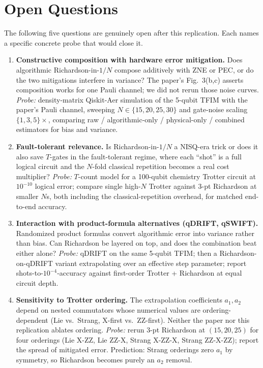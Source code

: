 \section*{Open Questions}

The following five questions are genuinely open after this replication.
Each names a specific concrete probe that would close it.

\begin{enumerate}
  \item \textbf{Constructive composition with hardware error mitigation.}
        Does algorithmic Richardson-in-$1/N$ compose additively with ZNE
        or PEC, or do the two mitigations interfere in variance?
        The paper's Fig.~3(b,c) asserts composition works for one Pauli
        channel; we did not rerun those noise curves.
        \emph{Probe:} density-matrix Qiskit-Aer simulation of the 5-qubit
        TFIM with the paper's Pauli channel, sweeping
        $N\in\{15,20,25,30\}$ and gate-noise scaling $\{1,3,5\}\times$,
        comparing raw / algorithmic-only / physical-only / combined
        estimators for bias and variance.

  \item \textbf{Fault-tolerant relevance.}
        Is Richardson-in-$1/N$ a NISQ-era trick or does it also save
        $T$-gates in the fault-tolerant regime, where each ``shot'' is
        a full logical circuit and the $N$-fold classical repetition
        becomes a real cost multiplier?
        \emph{Probe:} $T$-count model for a 100-qubit chemistry Trotter
        circuit at $10^{-10}$ logical error; compare single high-$N$
        Trotter against 3-pt Richardson at smaller $N$s, both including
        the classical-repetition overhead, for matched end-to-end
        accuracy.

  \item \textbf{Interaction with product-formula alternatives (qDRIFT,
        qSWIFT).}
        Randomized product formulas convert algorithmic error into
        variance rather than bias. Can Richardson be layered on top,
        and does the combination beat either alone?
        \emph{Probe:} qDRIFT on the same 5-qubit TFIM; then a
        Richardson-on-qDRIFT variant extrapolating over an effective
        step parameter; report shots-to-$10^{-4}$-accuracy against
        first-order Trotter + Richardson at equal circuit depth.

  \item \textbf{Sensitivity to Trotter ordering.}
        The extrapolation coefficients $a_1,a_2$ depend on nested
        commutators whose numerical values are ordering-dependent
        (Lie vs.\ Strang, X-first vs.\ ZZ-first). Neither the paper
        nor this replication ablates ordering.
        \emph{Probe:} rerun 3-pt Richardson at $(15,20,25)$ for four
        orderings (Lie X-ZZ, Lie ZZ-X, Strang X-ZZ-X, Strang ZZ-X-ZZ);
        report the spread of mitigated error. Prediction: Strang
        orderings zero $a_1$ by symmetry, so Richardson becomes purely
        an $a_2$ removal.


\end{enumerate}
